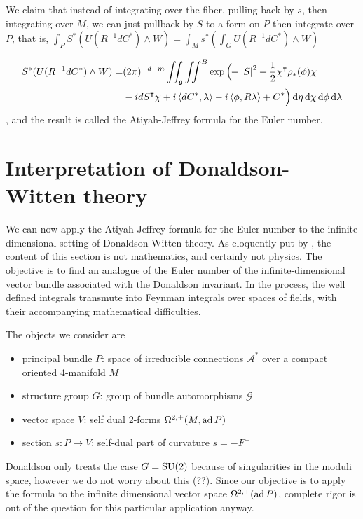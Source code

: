 We claim that instead of integrating over the fiber, pulling back by $s$, then
integrating over $M$, we can just pullback by  $S$ to a form on $P$ then
integrate over $P$, that is,
$\int_P S^*(U(R^{-1}dC^*) \wedge W) = \int_M s^*(\int_G U(R^{-1}dC^*)\wedge W)$

\begin{align} \label{eq:AJ_formula_euler}
S^*(U(R^{-1}dC^*)\wedge W)	
= &(2\pi)^{-d-m}\iint_{\g}\iint^B 
\exp\Big(\!\!-\abs{S}^2+\frac{1}{2}\chi^{\intercal}\rho_*(\phi)\chi \\
	&- idS^\intercal \chi
	+i\gen{dC^*,\lambda}-i\gen{\phi,R\lambda} + C^*\Big)  \odif{\eta}
	\odif{\chi} \odif{\phi}\odif{\lambda}  \nonumber 
\end{align}
, and
the result is called the Atiyah-Jeffrey formula for the Euler number.

\section{Interpretation of Donaldson-Witten theory}
We can now apply the Atiyah-Jeffrey formula for the Euler number to the infinite 
dimensional setting of Donaldson-Witten theory. As eloquently put by \citet{naber},
the content of this section is not mathematics, and certainly not physics. The
objective is to find an analogue of the Euler number of the
infinite-dimensional vector bundle associated with the Donaldson invariant. In
the process, the well defined integrals transmute into Feynman integrals
over spaces of fields, with their accompanying mathematical difficulties.  

The objects we consider are 
\begin{itemize}
	\item principal bundle $P$: space of irreducible connections  $\mathcal{A}^*$ 
		over a compact oriented 4-manifold $M$
	\item structure group $G$: group of bundle automorphisms  $\mathcal{G}$ 
	\item vector space $V$: self dual 2-forms $\Omega^{2,+}(M,\operatorname{ad} P)$ 
	\item section $s:P\to V$: self-dual part of curvature  $s=-F^+$
\end{itemize}
Donaldson only treats the case $G=\operatorname{SU}(2)$ because of singularities in the moduli
space, however we do not worry about this (??). Since our objective is to apply the
formula to the infinite dimensional vector space $\Omega^{2,+}(\operatorname{ad} P)$, complete
rigor is out of the question for this particular application anyway. 

